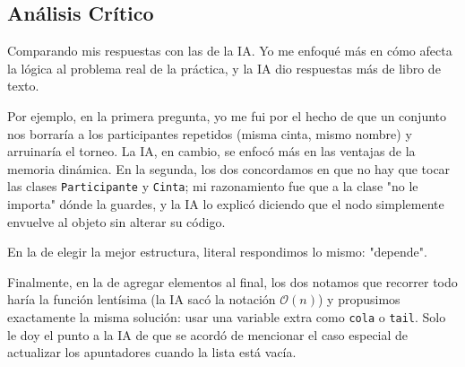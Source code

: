 \documentclass[12pt, letterpaper]{article}
\begin{document}
\subsection*{Análisis Crítico}


Comparando mis respuestas con las de la IA. Yo me enfoqué más en cómo afecta la lógica al problema real de la práctica, y la IA dio respuestas más de libro de texto.

Por ejemplo, en la primera pregunta, yo me fui por el hecho de que un conjunto nos borraría a los participantes repetidos (misma cinta, mismo nombre) y arruinaría el torneo. La IA, en cambio, se enfocó más en las ventajas de la memoria dinámica. En la segunda, los dos concordamos en que no hay que tocar las clases \texttt{Participante} y \texttt{Cinta}; mi razonamiento fue que a la clase "no le importa" dónde la guardes, y la IA lo explicó diciendo que el nodo simplemente envuelve al objeto sin alterar su código.

En la de elegir la mejor estructura, literal respondimos lo mismo: "depende".

Finalmente, en la de agregar elementos al final, los dos notamos que recorrer todo haría la función lentísima (la IA sacó la notación $\mathcal{O}(n)$) y propusimos exactamente la misma solución: usar una variable extra como \texttt{cola} o \texttt{tail}. Solo le doy el punto a la IA de que se acordó de mencionar el caso especial de actualizar los apuntadores cuando la lista está vacía. 
\end{document}
